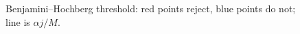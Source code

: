 \begin{figure}[H]
\centering

\caption{Benjamini--Hochberg threshold: \textcolor{red!70!black}{red} points reject, \textcolor{blue!70!black}{blue} points do not; line is $\alpha j/M$.}
\label{fig:benjamini-hochberg-step-up}
\end{figure}
